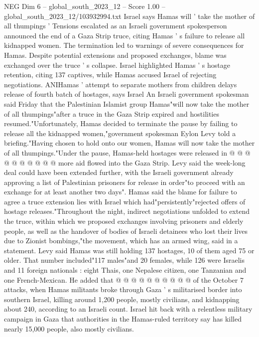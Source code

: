 \begin{textsample}{NEG Dim 6 – global\_south\_2023\_12 – Score 1.00 – global\_south\_2023\_12/103932994.txt}  \label{ex:f6_neg_319}
Israel says Hamas will ' take the mother of all thumpings ' Tensions escalated as an Israeli government spokesperson announced the end of a Gaza Strip truce, citing Hamas ' s failure to release all kidnapped women.
The termination led to warnings of severe consequences for Hamas.
Despite potential extensions and proposed exchanges, blame was exchanged over the truce ' s collapse.
Israel highlighted Hamas ' s hostage retention, citing 137 captives, while Hamas accused Israel of rejecting negotiations.
ANIHamas ' attempt to separate mothers from children delays release of fourth batch of hostages, says Israel An Israeli government spokesman said Friday that the Palestinian Islamist group Hamas"will now take the mother of all thumpings"after a truce in the Gaza Strip expired and hostilities resumed."Unfortunately, Hamas decided to terminate the pause by failing to release all the kidnapped women,"government spokesman Eylon Levy told a briefing."Having chosen to hold onto our women, Hamas will now take the mother of all thumpings."Under the pause, Hamas-held hostages were released in @ @ @ @ @ @ @ @ @ @ more aid flowed into the Gaza Strip.
Levy said the week-long deal could have been extended further, with the Israeli government already approving a list of Palestinian prisoners for release in order"to proceed with an exchange for at least another two days".
Hamas said the blame for failure to agree a truce extension lies with Israel which had"persistently"rejected offers of hostage releases."Throughout the night, indirect negotiations unfolded to extend the truce, within which we proposed exchanges involving prisoners and elderly people, as well as the handover of bodies of Israeli detainees who lost their lives due to Zionist bombings,"the movement, which has an armed wing, said in a statement.
Levy said Hamas was still holding 137 hostages, 10 of them aged 75 or older.
That number included"117 males"and 20 females, while 126 were Israelis and 11 foreign nationals : eight Thais, one Nepalese citizen, one Tanzanian and one French-Mexican.
He added that @ @ @ @ @ @ @ @ @ @ of the October 7 attacks, when Hamas militants broke through Gaza ' s militarised border into southern Israel, killing around 1,200 people, mostly civilians, and kidnapping about 240, according to an Israeli count.
Israel hit back with a relentless military campaign in Gaza that authorities in the Hamas-ruled territory say has killed nearly 15,000 people, also mostly civilians.

\end{textsample}
